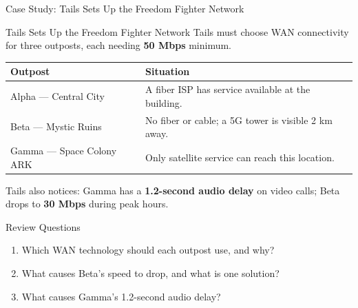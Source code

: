 \documentclass[aspectratio=169]{beamer}  %
\begin{document}
\begin{frame}[t]{Case Study: Tails Sets Up the Freedom Fighter Network}
    \begin{casestudy}{Tails Sets Up the Freedom Fighter Network}
        \footnotesize
        Tails must choose WAN connectivity for three outposts, each needing \textbf{50 Mbps} minimum.
        \vspace{0.1em}
        \begin{center}
            \begin{tabular}{l p{7cm}}
                \toprule
                \textbf{Outpost}              & \textbf{Situation} \\
                \midrule
                Alpha --- Central City        & A fiber ISP has service available at the building. \\
                Beta --- Mystic Ruins         & No fiber or cable; a 5G tower is visible 2 km away. \\
                Gamma --- Space Colony ARK    & Only satellite service can reach this location. \\
                \bottomrule
            \end{tabular}
        \end{center}

        \vspace{0.3em}
        Tails also notices: Gamma has a \textbf{1.2-second audio delay} on video calls; Beta drops to \textbf{30 Mbps} during peak hours.
    \end{casestudy}

    \begin{block}{Review Questions}
        \begin{enumerate}
            \footnotesize
            \item Which WAN technology should each outpost use, and why?
            \item What causes Beta's speed to drop, and what is one solution?
            \item What causes Gamma's 1.2-second audio delay?
        \end{enumerate}
    \end{block}
\end{frame}
\end{document}

